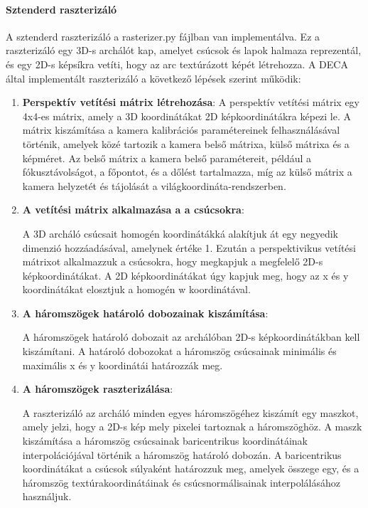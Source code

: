 \documentclass[12pt,a4]{article}
\begin{document}
         \paragraph{Sztenderd raszterizáló}
             A sztenderd raszterizáló a rasterizer.py fájlban van implementálva.
             Ez a raszterizáló egy 3D-s archálót kap, amelyet csúcsok és lapok halmaza reprezentál, és egy 2D-s képsíkra vetíti, hogy az arc textúrázott képét létrehozza.
             A DECA \cite{deca} által implementált raszterizáló a következő lépések szerint működik:
             \begin{enumerate}
                 \item \textbf{Perspektív vetítési mátrix létrehozása}:
                        A perspektív vetítési mátrix egy 4x4-es mátrix, amely a 3D koordinátákat 2D képkoordinátákra képezi le. 
            	        A mátrix kiszámítása a kamera kalibrációs paramétereinek felhasználásával történik, amelyek közé tartozik a kamera belső mátrixa, külső mátrixa és a képméret. 
                        Az belső mátrix a kamera belső paramétereit, például a fókusztávolságot, a főpontot, 
                        és a dőlést tartalmazza, míg az külső mátrix a kamera helyzetét és tájolását a világkoordináta-rendszerben.
                 
                 \item \textbf{A vetítési mátrix alkalmazása a a csúcsokra}:
         
                        A 3D archáló csúcsait homogén koordinátákká alakítjuk át egy negyedik dimenzió hozzáadásával, amelynek értéke 1. 
                    	Ezután a perspektivikus vetítési mátrixot alkalmazzuk a csúcsokra, hogy megkapjuk a megfelelő 2D-s képkoordinátákat. 
                    	A 2D képkoordinátákat úgy kapjuk meg, hogy az x és y koordinátákat elosztjuk a homogén w koordinátával.
     
                 \item \textbf{A háromszögek határoló dobozainak kiszámítása}:
         
                        A háromszögek határoló dobozait az archálóban 2D-s képkoordinátákban kell kiszámítani.
                    	A határoló dobozokat a háromszög csúcsainak minimális és maximális x és y koordinátái határozzák meg.
     
                 \item \textbf{A háromszögek raszterizálása}:
         
                        A raszterizáló az archáló minden egyes háromszögéhez kiszámít egy maszkot, amely jelzi, hogy a 2D-s kép mely pixelei tartoznak a háromszöghöz. 
                        A maszk kiszámítása a háromszög csúcsainak baricentrikus koordinátáinak interpolációjával történik a háromszög határoló dobozán.
                    	A baricentrikus koordinátákat a csúcsok súlyaként határozzuk meg, amelyek összege egy, és a háromszög textúrakoordinátáinak és csúcsnormálisainak interpolálásához használjuk.
     

\end{enumerate}
\end{document}
